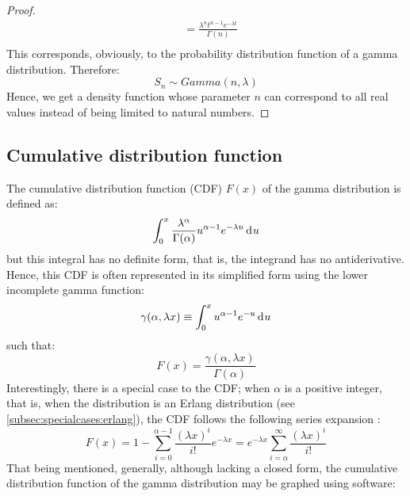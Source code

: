\documentclass[12pt]{article}
\begin{document}
\begin{proof}
\begin{equation}
\begin{split}
						&=	\frac{\lambda^n t^{n-1} e^{-\lambda t}}{\Gamma(n)}\\
		\end{split}
	\end{equation}
	This corresponds, obviously, to the probability distribution function of a gamma distribution. Therefore:
	\begin{equation}
		S_n \sim Gamma(n, \lambda)
	\end{equation}
	Hence, we get a density function whose parameter $n$ can correspond to all real values instead of being limited to
	natural numbers.
\end{proof}


\pagebreak
\subsection{Cumulative distribution function}\label{subsec:gamma:cdf} The cumulative distribution
function (CDF) $F(x)$ of the gamma distribution is defined as:
\begin{equation}
	\int^x_0\frac{\lambda^\alpha}{\Gamma(\alpha)}u^{\alpha-1}e^{-\lambda u}\mathop{}\!\mathrm{d^{}}u
\end{equation}
but this integral has no definite form, that is, the integrand has no antiderivative. Hence, this CDF is often
represented in its simplified form using the lower incomplete gamma function\cite{weissteinIncompleteGammaFunction}:
\begin{equation}
	\gamma(\alpha, \lambda x)\equiv\int^x_0u^{\alpha-1}e^{-u}\mathop{}\!\mathrm{d^{}}u
\end{equation}
such that:
\begin{equation}
	F(x) = \frac{\gamma(\alpha, \lambda x)}{\Gamma(\alpha)}
\end{equation}
Interestingly, there is a special case to the CDF; when $\alpha$ is a positive integer, that is, when the distribution
is an Erlang distribution (see \autoref{subsec:specialcases:erlang}), the CDF follows the following series expansion
\cite{wikipediaGammaDistribution2022}:
\begin{equation}
	F(x) = 1-\sum^{\alpha-1}_{i=0}\frac{(\lambda x)^i}{i!}e^{-\lambda x} = e^{-\lambda x}\sum^\infty_{i=\alpha}\frac{(\lambda x)^i}{i!}
\end{equation}
That being mentioned, generally, although lacking a closed form, the cumulative distribution function of the gamma
distribution may be graphed using software:
\end{document}
